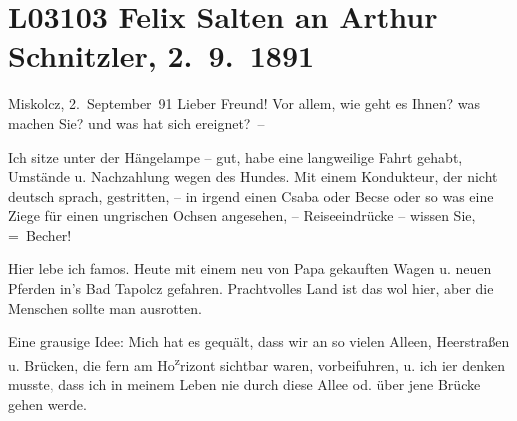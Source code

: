 

\section[Felix Salten an Arthur Schnitzler, 2. 9. 1891]{L03103 Felix Salten an Arthur Schnitzler, 2. 9. 1891}
\nopagebreak{}
\rehead{ }\normalsize\beginnumbering{}
\toendnotes[C]{\smallbreak\pagebreak[2]}
\toendnotes[C]{\smallbreak}
\toendnotes[C]{\smallbreak}
\pstart
           \raggedleft{}{\pb}Miskolcz, 2. September 91\pend
           \vspace{0.5em}
\pstart
           Lieber Freund! Vor allem, wie geht es Ihnen? was
               machen Sie? und was hat sich ereignet? –\pend
           
\pstart
           Ich sitze unter der Hängelampe – gut, habe eine langweilige Fahrt gehabt, Umstände u.
               Nachzahlung wegen des Hundes. Mit einem Kondukteur, der nicht deutsch sprach,
               gestritten, – in irgend einen Csaba oder Becse oder so was eine Ziege für einen
               ungrischen Ochsen angesehen, – Reiseeindrücke – wissen Sie, = Becher!\pend
           
\pstart
           {\pb}Hier lebe ich famos. Heute mit einem neu von Papa gekauften Wagen u. neuen Pferden in’s
                  Bad Tapolcz gefahren. Prachtvolles Land ist das wol hier, aber
               die Menschen sollte man ausrotten.\pend
           
\pstart
           Eine grausige Idee: Mich hat es gequält, dass wir an so vielen Alleen, Heerstraßen u.
               Brücken,  die fern am Ho\substVorne{}\textsuperscript{z}\substDazwischen{}r\substHinten{}izont sichtbar waren, vorbeifuhren, u. ich i{\geminationm}er
               denken musste\textcolor{gray}{,} dass ich in meinem Leben nie durch diese Allee od.
               über jene Brücke gehen werde.\pend
           
